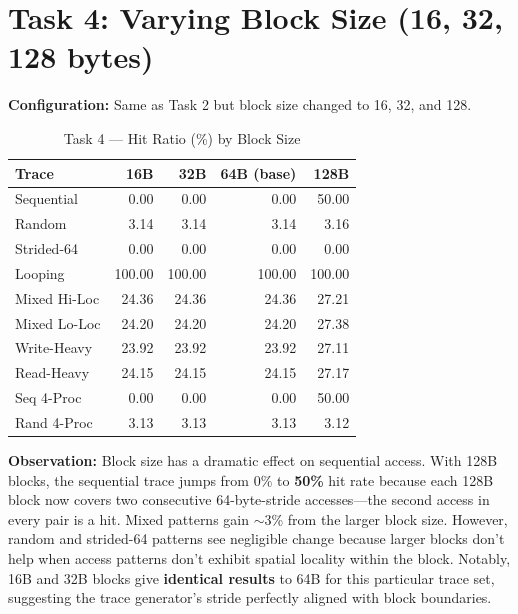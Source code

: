 \documentclass[12pt,a4paper]{article}
\begin{document}
\section{Task 4: Varying Block Size (16, 32, 128 bytes)}

\textbf{Configuration:} Same as Task 2 but block size changed to 16, 32, and 128.

\begin{table}[H]
\centering
\caption{Task 4 --- Hit Ratio (\%) by Block Size}
\begin{tabular}{lrrrr}
\toprule
\textbf{Trace} & \textbf{16B} & \textbf{32B} & \textbf{64B (base)} & \textbf{128B} \\
\midrule
Sequential     & 0.00  & 0.00  & 0.00  & 50.00 \\
Random         & 3.14  & 3.14  & 3.14  & 3.16  \\
Strided-64     & 0.00  & 0.00  & 0.00  & 0.00  \\
Looping        & 100.00& 100.00& 100.00& 100.00\\
Mixed Hi-Loc   & 24.36 & 24.36 & 24.36 & 27.21 \\
Mixed Lo-Loc   & 24.20 & 24.20 & 24.20 & 27.38 \\
Write-Heavy    & 23.92 & 23.92 & 23.92 & 27.11 \\
Read-Heavy     & 24.15 & 24.15 & 24.15 & 27.17 \\
Seq 4-Proc     & 0.00  & 0.00  & 0.00  & 50.00 \\
Rand 4-Proc    & 3.13  & 3.13  & 3.13  & 3.12  \\
\bottomrule
\end{tabular}
\end{table}

\textbf{Observation:} Block size has a dramatic effect on sequential access. With 128B blocks, the sequential trace jumps from 0\% to \textbf{50\%} hit rate because each 128B block now covers two consecutive 64-byte-stride accesses---the second access in every pair is a hit. Mixed patterns gain $\sim$3\% from the larger block size. However, random and strided-64 patterns see negligible change because larger blocks don't help when access patterns don't exhibit spatial locality within the block. Notably, 16B and 32B blocks give \textbf{identical results} to 64B for this particular trace set, suggesting the trace generator's stride perfectly aligned with block boundaries.

\end{document}

